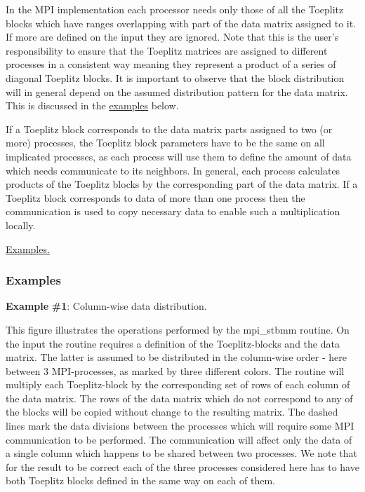 In the M\-P\-I implementation each processor needs only those of all the Toeplitz blocks which have ranges overlapping with part of the data matrix assigned to it. If more are defined on the input they are ignored. Note that this is the user's responsibility to ensure that the Toeplitz matrices are assigned to different processes in a consistent way meaning they represent a product of a series of diagonal Toeplitz blocks. It is important to observe that the block distribution will in general depend on the assumed distribution pattern for the data matrix. This is discussed in the \hyperlink{toeplitz_funct_stbmm_examples}{examples} below.

If a Toeplitz block corresponds to the data matrix parts assigned to two (or more) processes, the Toeplitz block parameters have to be the same on all implicated processes, as each process will use them to define the amount of data which needs communicate to its neighbors. In general, each process calculates products of the Toeplitz blocks by the corresponding part of the data matrix. If a Toeplitz block corresponds to data of more than one process then the communication is used to copy necessary data to enable such a multiplication locally.

\hyperlink{toeplitz_funct_stbmm_examples}{Examples.} \subsubsection{Examples}\label{toeplitz_funct_stbmm_examples}
{\bfseries Example} {\bfseries \#1}\-: Column-\/wise data distribution.



This figure illustrates the operations performed by the {\ttfamily mpi\-\_\-stbmm} routine. On the input the routine requires a definition of the Toeplitz-\/blocks and the data matrix. The latter is assumed to be distributed in the column-\/wise order -\/ here between 3 M\-P\-I-\/processes, as marked by three different colors. The routine will multiply each Toeplitz-\/block by the corresponding set of rows of each column of the data matrix. The rows of the data matrix which do not correspond to any of the blocks will be copied without change to the resulting matrix. The dashed lines mark the data divisions between the processes which will require some M\-P\-I communication to be performed. The communication will affect only the data of a single column which happens to be shared between two processes. We note that for the result to be correct each of the three processes considered here has to have both Toeplitz blocks defined in the same way on each of them.

